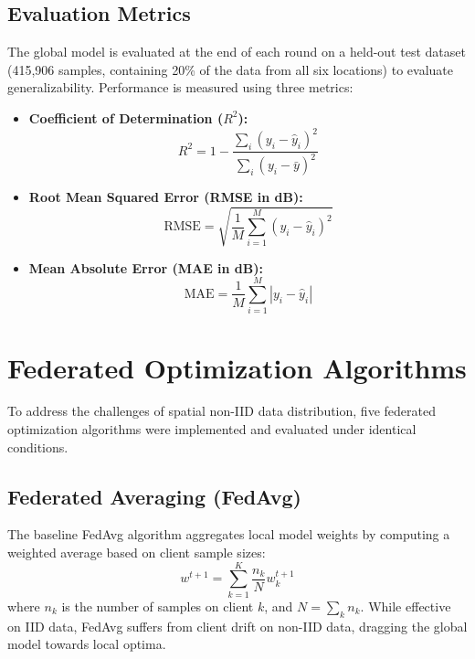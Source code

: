 \subsection{Evaluation Metrics}
The global model is evaluated at the end of each round on a held-out test dataset (415,906 samples, containing 20\% of the data from all six locations) to evaluate generalizability. Performance is measured using three metrics:
\begin{itemize}
    \item \textbf{Coefficient of Determination ($R^2$):}
    \begin{equation}
        R^2 = 1 - \frac{\sum_i (y_i - \hat{y}_i)^2}{\sum_i (y_i - \bar{y})^2}
    \end{equation}
    \item \textbf{Root Mean Squared Error (RMSE in dB):}
    \begin{equation}
        \text{RMSE} = \sqrt{\frac{1}{M}\sum_{i=1}^M (y_i - \hat{y}_i)^2}
    \end{equation}
    \item \textbf{Mean Absolute Error (MAE in dB):}
    \begin{equation}
        \text{MAE} = \frac{1}{M}\sum_{i=1}^M |y_i - \hat{y}_i|
    \end{equation}
\end{itemize}

\section{Federated Optimization Algorithms}
\label{sec:fl-algorithms}

To address the challenges of spatial non-IID data distribution, five federated optimization algorithms were implemented and evaluated under identical conditions.

\subsection{Federated Averaging (FedAvg)}
The baseline FedAvg algorithm aggregates local model weights by computing a weighted average based on client sample sizes:
\begin{equation}
    w^{t+1} = \sum_{k=1}^K \frac{n_k}{N} w_k^{t+1}
\end{equation}
where $n_k$ is the number of samples on client $k$, and $N = \sum_k n_k$. While effective on IID data, FedAvg suffers from client drift on non-IID data, dragging the global model towards local optima.


